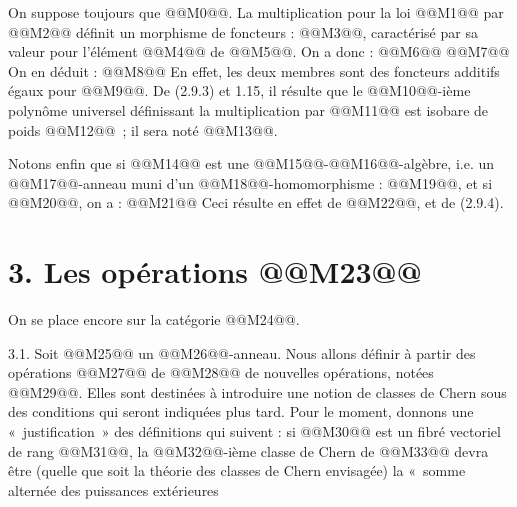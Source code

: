 
On
suppose toujours que @@M0@@. La multiplication pour la loi @@M1@@ par @@M2@@ définit un morphisme de foncteurs : @@M3@@, caractérisé par sa valeur pour l'élément @@M4@@ de @@M5@@. On a donc :
@@M6@@
@@M7@@
On en déduit :
@@M8@@
En effet, les deux membres sont des foncteurs additifs égaux pour @@M9@@. De (2.9.3) et 1.15, il résulte que le @@M10@@-ième polynôme universel définissant la multiplication par @@M11@@ est isobare de poids @@M12@@~; il sera noté @@M13@@.

Notons enfin que si @@M14@@ est une @@M15@@-@@M16@@-algèbre, i.e. un @@M17@@-anneau muni d'un @@M18@@-homomorphisme : @@M19@@, et si @@M20@@, on a :
@@M21@@
Ceci résulte en effet de @@M22@@, et de (2.9.4).

\section*{3. Les opérations @@M23@@}

On se place encore sur la catégorie @@M24@@.

3.1. Soit @@M25@@ un @@M26@@-anneau. Nous allons définir à partir des opérations @@M27@@ de @@M28@@ de nouvelles opérations, notées @@M29@@. Elles sont destinées à introduire une notion de classes de Chern sous des conditions qui seront indiquées plus tard. Pour le moment, donnons une «~justification~» des définitions qui suivent : si @@M30@@ est un fibré vectoriel de rang @@M31@@, la @@M32@@-ième classe de Chern de @@M33@@ devra être (quelle que soit la théorie des classes de Chern envisagée) la «~somme alternée des puissances extérieures 
